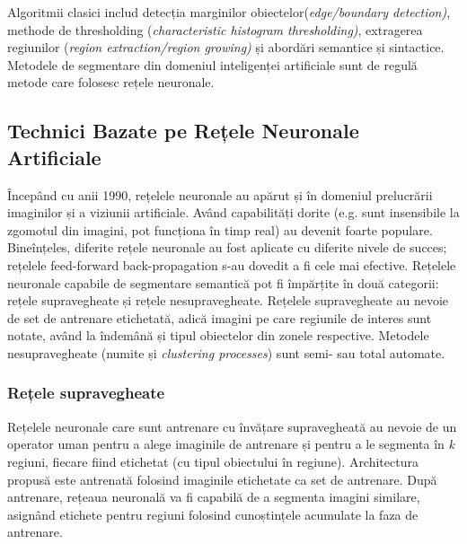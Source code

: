 Algoritmii clasici includ detecția marginilor obiectelor(\textit{edge/boundary detection)}, methode de thresholding (\textit{characteristic histogram thresholding)}, extragerea regiunilor (\textit{region extraction/region growing)} și abordări semantice și sintactice.\newline
Metodele de segmentare din domeniul inteligenței artificiale sunt de regulă metode care folosesc rețele neuronale.\newline

\subsection{Technici Bazate pe Rețele Neuronale Artificiale}
Începând cu anii 1990, rețelele neuronale au apărut și în domeniul prelucrării imaginilor și a viziunii artificiale. Având capabilități dorite (e.g. sunt insensibile la zgomotul din imagini, pot funcționa în timp real) au devenit foarte populare. Bineînțeles, diferite rețele neuronale au fost aplicate cu diferite nivele de succes; rețelele feed-forward back-propagation s-au dovedit a fi cele mai efective.\newline
Rețelele neuronale capabile de segmentare semantică pot fi împărțite în două categorii: rețele supravegheate și rețele nesupravegheate. Rețelele supravegheate au nevoie de set de antrenare etichetată, adică imagini pe care regiunile de interes sunt notate, având la îndemână și tipul obiectelor din zonele respective. Metodele nesupravegheate (numite și \textit{clustering processes}) sunt semi- sau total automate.

\subsubsection{Rețele supravegheate}
Rețelele neuronale care sunt antrenare cu învățare supravegheată au nevoie de un operator uman pentru a alege imaginile de antrenare și pentru a le segmenta în \textit{k} regiuni, fiecare fiind etichetat (cu tipul obiectului în regiune). Architectura propusă este antrenată folosind imaginile etichetate ca set de antrenare. După antrenare, rețeaua neuronală va fi capabilă de a segmenta imagini similare, asignând etichete pentru regiuni folosind cunoștințele acumulate la faza de antrenare.

